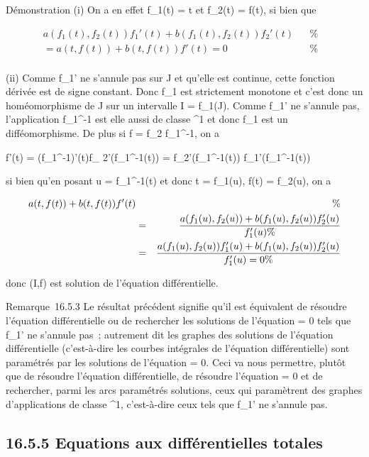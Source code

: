 Démonstration (i) On a en effet f_1(t) = t et f_2(t) =
f(t), si bien que

\begin{align*}
a(f_1(t),f_2(t))f_1'(t) +
b(f_1(t),f_2(t))f_2'(t)& & \%&
\\ = a(t,f(t)) + b(t,f(t))f'(t) = 0& &
\%& \\ \end{align*}

(ii) Comme f_1' ne s'annule pas sur J et qu'elle est continue,
cette fonction dérivée est de signe constant. Donc f_1 est
strictement monotone et c'est donc un homéomorphisme de J sur un
intervalle I = f_1(J). Comme f_1' ne s'annule pas,
l'application f_1^-1 est elle aussi de classe
^1 et donc f_1 est un difféomorphisme. De plus si f
= f_2 \cdot f_1^-1, on a

f'(t) = \left
(f_1^-1\right )'(t)f_
2'(f_1^-1(t)) =
f_2'(f_1^-1(t)) \over
f_1'(f_1^-1(t))

si bien qu'en posant u = f_1^-1(t) et donc t =
f_1(u), f(t) = f_2(u), on a

\begin{align*} a(t,f(t)) + b(t,f(t))f'(t)&& \%&
\\ & =&
a(f_1(u),f_2(u)) +
b(f_1(u),f_2(u)) f_2'(u)
\over f_1'(u) \%&
\\ & =&
a(f_1(u),f_2(u))f_1'(u) +
b(f_1(u),f_2(u))f_2'(u) \over
f_1'(u) = 0\%& \\
\end{align*}

donc (I,f) est solution de l'équation différentielle.

Remarque~16.5.3 Le résultat précédent signifie qu'il est équivalent de
résoudre l'équation différentielle ou de rechercher les solutions de
l'équation \omega = 0 tels que f_1' ne s'annule pas~; autrement dit
les graphes des solutions de l'équation différentielle (c'est-à-dire les
courbes intégrales de l'équation différentielle) sont paramétrés par les
solutions de l'équation \omega = 0. Ceci va nous permettre, plutôt que de
résoudre l'équation différentielle, de résoudre l'équation \omega = 0 et de
rechercher, parmi les arcs paramétrés solutions, ceux qui paramètrent
des graphes d'applications de classe ^1, c'est-à-dire ceux
tels que f_1' ne s'annule pas.

\subsection{16.5.5 Equations aux différentielles totales}


